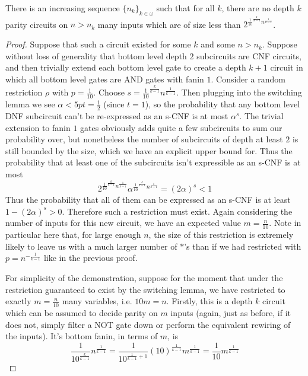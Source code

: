 \begin{corollary}
	There is an increasing sequence $\{n_k\}_{k \in \omega}$ such that for all $k$, there are no depth $k$ parity circuits on $n > n_k$ many inputs which are of size less than $2^{\frac{1}{10}^{\frac{k}{k-1}}n^{\frac{1}{k-1}}}$.
\end{corollary}
\begin{proof}
	Suppose that such a circuit existed for some $k$ and some $n > n_k$. Suppose without loss of generality that bottom level depth $2$ subcircuits are CNF circuits, and then trivially extend each bottom level gate to create a depth $k+1$ circuit in which all bottom level gates are AND gates with fanin $1$. Consider a random restriction $\rho$ with $p = \frac{1}{10}$. Choose $s = \frac{1}{10}^{\frac{k}{k-1}}n^{\frac{1}{k-1}}$. Then plugging into the switching lemma we see $\alpha < 5pt = \frac{1}{2}$ (since $t = 1$), so the probability that any bottom level DNF subcircuit can't be re-expressed as an s-CNF is at most $\alpha^s$. The trivial extension to fanin $1$ gates obviously adds quite a few subcircuits to sum our probability over, but nonetheless the number of subcircuits of depth at least $2$ is still bounded by the size, which we have an explicit upper bound for. Thus the probability that at least one of the subcircuits isn't expressible as an s-CNF is at most 
	\[ 2^{\frac{1}{10}^{\frac{k}{k-1}}n^{\frac{1}{k-1}}}\alpha^{\frac{1}{10}^{\frac{k}{k-1}}n^{\frac{1}{k-1}}} = (2\alpha)^s < 1 \]
Thus the probability that all of them can be expressed as an s-CNF is at least $1-(2\alpha)^s > 0$. Therefore such a restriction must exist. Again considering the number of inputs for this new circuit, we have an expected value $m = \frac{n}{10}$. Note in particular here that, for large enough $n$, the size of this restriction is extremely likely to leave us with a much larger number of $*$'s than if we had restricted with $p = n^{-\frac{1}{k-1}}$ like in the previous proof. \par
For simplicity of the demonstration, suppose for the moment that under the restriction guaranteed to exist by the switching lemma, we have restricted to exactly $m = \frac{n}{10}$ many variables, i.e. $10m = n$. Firstly, this is a depth $k$ circuit which can be assumed to decide parity on $m$ inputs (again, just as before, if it does not, simply filter a NOT gate down or perform the equivalent rewiring of the inputs). It's bottom fanin, in terms of $m$, is 
\[ \frac{1}{10^{\frac{k}{k-1}}}n^{\frac{1}{k-1}} = \frac{1}{10^{\frac{1}{k-1}+1}}(10)^{\frac{1}{k-1}}m^{\frac{1}{k-1}} = \frac{1}{10}m^{\frac{1}{k-1}} \]

\end{proof}
